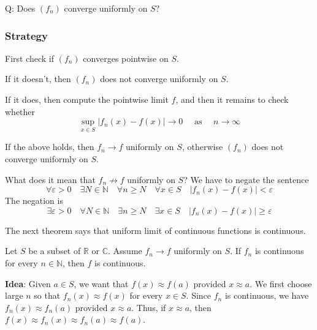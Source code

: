 \documentclass[a4paper]{article}
\begin{document}
Q: Does $\left(f_{n}\right)$ converge uniformly on $S ?$
\subsubsection*{Strategy}
First check if $\left(f_{n}\right)$ converges pointwise on $S$.

If it doesn't, then $\left(f_{n}\right)$ does not converge uniformly on $S$.

If it does, then compute the pointwise limit $f$, and then it remains to check whether
\[
\sup _{x \in S}\left|f_{n}(x)-f(x)\right| \rightarrow 0 \quad \text { as } \quad n \rightarrow \infty
\]

If the above holds, then $f_{n} \rightarrow f$ uniformly on $S$, otherwise $\left(f_{n}\right)$ does not converge uniformly on $S$.

\begin{remark}
    What does it mean that $f_{n} \not \rightarrow f$ uniformly on $S$? We have to negate the sentence
    \[
    \forall \varepsilon>0 \quad \exists N \in \mathbb{N} \quad \forall n \geqslant N \quad \forall x \in S \quad\left|f_{n}(x)-f(x)\right|<\varepsilon
    \]
    The negation is
    \[
    \exists \varepsilon>0 \quad \forall N \in \mathbb{N} \quad \exists n \geqslant N \quad \exists x \in S \quad\left|f_{n}(x)-f(x)\right| \geqslant \varepsilon
    \]
\end{remark}

The next theorem says that uniform limit of continuous functions is continuous.
\begin{theorem}\label{thm:1}
    Let $S$ be a subset of $\mathbb{R}$ or $\mathbb{C}$. Assume $f_{n} \rightarrow f$ uniformly on $S$. If $f_{n}$ is continuous for every $n \in \mathbb{N}$, then $f$ is continuous.
\end{theorem}

\textsf{\textbf{Idea}}: Given $a \in S$, we want that $f(x) \approx f(a)$ provided $x \approx a$. We first choose large $n$ so that $f_{n}(x) \approx f(x)$ for every $x \in S$. Since $f_{n}$ is continuous, we have $f_{n}(x) \approx f_{n}(a)$ provided $x \approx a$. Thus, if $x \approx a$, then $f(x) \approx f_{n}(x) \approx f_{n}(a) \approx f(a)$.
\end{document}
